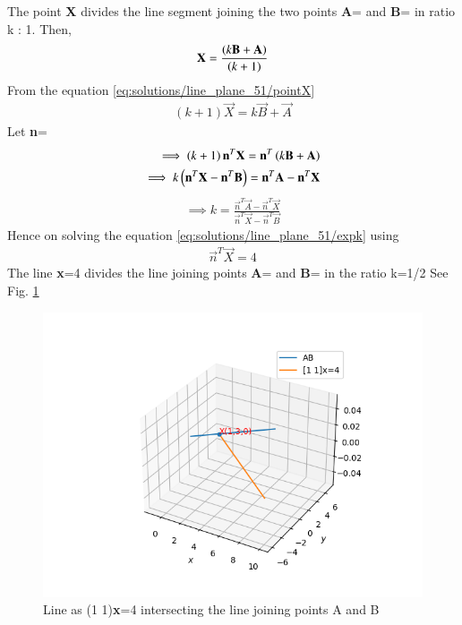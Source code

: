 The point \textbf{X} divides the line segment joining the two points \textbf{A}= and \textbf{B}= in ratio k : 1. Then,\\
\begin{align}
\label{eq:solutions/line_plane_51/pointX}
\mathbf{X}=\frac{\left(k\mathbf{B}+\mathbf{A}\right)}{\left(k+1\right)}
\end{align}
From the equation \eqref{eq:solutions/line_plane_51/pointX}
\begin{align}
(k+1)\vec{X} = k\vec{B}+\vec{A}
\end{align}
Let \textbf{n}=
\begin{align}
\implies \left(k+1\right)\mathbf{n}^T\mathbf{X}=\mathbf{n}^T\left(k\mathbf{B}+\mathbf{A}\right)\\
\implies k\left(\mathbf{n}^T\mathbf{X}-\mathbf{n}^T\mathbf{B}\right)=\mathbf{n}^T\mathbf{A}-\mathbf{n}^T\mathbf{X}
\end{align}
\begin{align}
\label{eq:solutions/line_plane_51/expk}
\implies k=\frac{\vec{n}^T\vec{A}-\vec{n}^T\vec{X}}{\vec{n}^T\vec{X}-\vec{n}^T\vec{B}}
\end{align}
Hence on solving the equation \eqref{eq:solutions/line_plane_51/expk} using
\begin{align}
\vec{n}^T\vec{X}=4
\end{align}
The line \textbf{x}=4 divides the line joining points \textbf{A}= and \textbf{B}= in the ratio k=1/2
See Fig. \ref{fig1:solutions/line_plane_51/}

\begin{figure}[!ht]
\centering
\includegraphics[width=\columnwidth]{./solutions/line_plane/51/Plot.png}
\caption{Line as (1 1)\textbf{x}=4 intersecting the line joining points A and B}
\label{fig1:solutions/line_plane_51/}
\end{figure}
